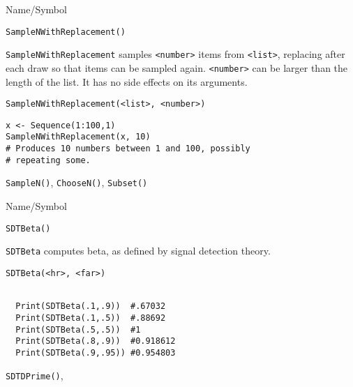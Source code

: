 \rl


\begin{desc}{Name/Symbol}
\item[Name/Symbol] 	\verb+SampleNWithReplacement()+

\item[Description] \verb+SampleNWithReplacement+ samples
  \verb+<number>+ items from \verb+<list>+, replacing after each draw
  so that items can be sampled again.  \verb+<number>+ can be larger
  than the length of the list. It has no side effects on its
  arguments.  
\item[Usage]        	
\begin{verbatim}
SampleNWithReplacement(<list>, <number>)
\end{verbatim}

\item[Example] 	
\begin{verbatim}
x <- Sequence(1:100,1)
SampleNWithReplacement(x, 10)
# Produces 10 numbers between 1 and 100, possibly 
# repeating some.
\end{verbatim}

\item[See Also]     	\verb+SampleN()+, \verb+ChooseN()+, \verb+Subset()+
\end{desc}

\rl


\begin{desc}{Name/Symbol}
\item[Name/Symbol] 	\verb+SDTBeta()+

\item[Description] \verb+SDTBeta+ computes beta, as defined by signal detection theory.  

\item[Usage]        	
\begin{verbatim}
SDTBeta(<hr>, <far>)
\end{verbatim}

\item[Example] 	
\begin{verbatim}

  Print(SDTBeta(.1,.9))  #.67032
  Print(SDTBeta(.1,.5))  #.88692
  Print(SDTBeta(.5,.5))  #1
  Print(SDTBeta(.8,.9))  #0.918612
  Print(SDTBeta(.9,.95)) #0.954803
\end{verbatim}

\item[See Also]\verb+SDTDPrime()+,
\end{desc}

\rl

